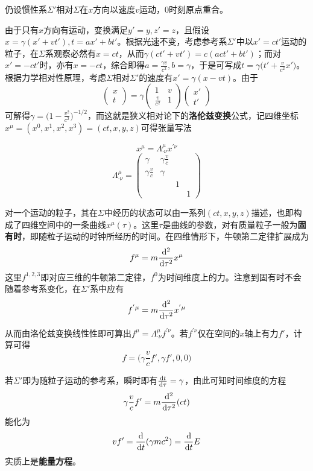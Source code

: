 \documentclass[a4paper,UTF8,fontset=windows]{ctexart}
\newcommand*{\dr}{\hspace{0.07em}\mathrm{d}}
\begin{document}
仍设惯性系$\Sigma'$相对$\Sigma$在$x$方向以速度$v$运动，0时刻原点重合。

由于只有$x$方向有运动，变换满足$y'=y,z'=z$，且假设$x=\gamma(x'+vt'),t=ax'+bt'$。根据光速不变，考虑参考系$\Sigma'$中以$x'=ct'$运动的粒子，在$\Sigma$系观察必然有$x=ct$，从而$\gamma(ct'+vt')=c(act'+bt')$；而对$x'=-ct'$时，亦有$x=-ct$，综合即得$a=\frac{\gamma v}{c^2},b=\gamma$，于是可写成$t=\gamma\big(t'+\frac{v}{c^2}x'\big)$。根据力学相对性原理，考虑$\Sigma$相对$\Sigma'$的速度有$x'=\gamma(x-vt)$。由于
$$\begin{pmatrix}x\\t\end{pmatrix}=\gamma\begin{pmatrix}1&v\\\frac{v}{c^2}&1\end{pmatrix}\begin{pmatrix}x'\\t'\end{pmatrix}$$
可解得$\gamma=\big(1-\frac{v^2}{c^2}\big)^{-1/2}$，而这就是狭义相对论下的\textbf{洛伦兹变换}公式，记四维坐标$x^\mu=(x^0,x^1,x^2,x^3)=(ct,x,y,z)$可得张量写法

$$x^\mu=\Lambda^\mu_{\cdot\nu}x^{\prime\nu}$$
$$\Lambda^\mu_{\cdot\nu}=\begin{pmatrix}\gamma&\gamma\frac{v}{c}&&\\\gamma\frac{v}{c}&\gamma&&\\ &&1&\\ &&&1\end{pmatrix}$$

对一个运动的粒子，其在$\Sigma$中经历的状态可以由一系列$(ct,x,y,z)$描述，也即构成了四维空间中的一条曲线$x^\mu(\tau)$。这里$\tau$是曲线的参数，对有质量粒子一般为\textbf{固有时}，即随粒子运动的时钟所经历的时间。在四维情形下，牛顿第二定律扩展成为
$$f^\mu=m\frac{\dr^2}{\dr\tau^2}x^\mu$$
这里$f^{1,2,3}$即对应三维的牛顿第二定律，$f^0$为时间维度上的力。注意到固有时不会随着参考系变化，在$\Sigma'$系中应有
$$f^{'\mu}=m\frac{\dr^2}{\dr\tau^2}x^{'\mu}$$

从而由洛伦兹变换线性性即可算出$f^\mu=\Lambda^\mu_{\cdot\nu}f^{\prime\nu}$。若$f^{\prime\nu}$仅在空间的$x$轴上有力$f'$，计算可得
$$f=\bigg(\gamma\frac{v}{c}f',\gamma f',0,0\bigg)$$

若$\Sigma'$即为随粒子运动的参考系，瞬时即有$\frac{\dr t}{\dr\tau}=\gamma$，由此可知时间维度的方程
$$\gamma\frac{v}{c}f'=m\frac{\dr^2}{\dr\tau^2}(ct)$$
能化为
$$vf'=\frac{\dr}{\dr t}(\gamma mc^2)=\frac{\dr}{\dr t}E$$
实质上是\textbf{能量方程}。
\end{document}
